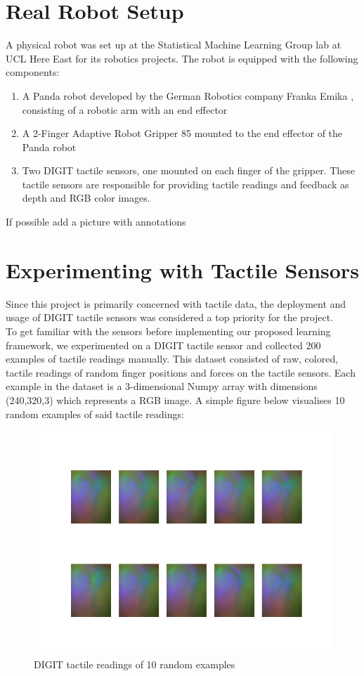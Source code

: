 \documentclass[12pt, a4paper]{report}
\theoremstyle{definition}
\begin{document}
\section{Real Robot Setup}
A physical robot was set up at the Statistical Machine Learning Group lab at UCL Here East for its robotics projects. The robot is equipped with the following components:
\begin{enumerate}
    \item A Panda robot developed by the German Robotics company Franka Emika \cite{franka}, consisting of a robotic arm with an end effector
    \item A 2-Finger Adaptive Robot Gripper 85 \cite{robotiq} mounted to the end effector of the Panda robot
    \item Two DIGIT \cite{digit} tactile sensors, one mounted on each finger of the gripper. These tactile sensors are responsible for providing tactile readings and feedback as depth and RGB color images.
\end{enumerate}
{\color{red}If possible add a picture with annotations}

\section{Experimenting with Tactile Sensors}
Since this project is primarily concerned with tactile data, the deployment and usage of DIGIT \cite{digit} tactile sensors was considered a top priority for the project.\\

To get familiar with the sensors before implementing our proposed learning framework, we experimented on a DIGIT tactile sensor and collected 200 examples of tactile readings manually. This dataset consisted of raw, colored, tactile readings of random finger positions and forces on the tactile sensors. Each example in the dataset is a 3-dimensional Numpy array with dimensions (240,320,3) which represents a RGB image. A simple figure below visualises 10 random examples of said tactile readings:
\begin{figure}[H]
    \centering
    \includegraphics[scale=0.4]{docs/Project Report/Media/tacto_testing.png}
    \caption{DIGIT tactile readings of 10 random examples}
    \label{fig:digit\_readings}
\end{figure}
\end{document}
